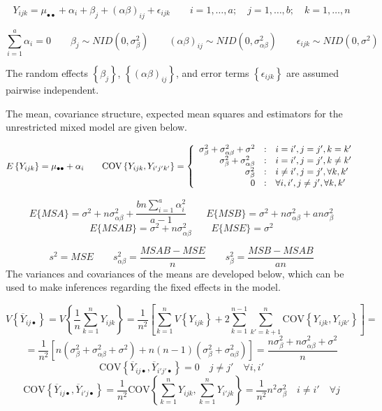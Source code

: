\documentclass[
]{book}
\begin{document}
\[
Y_{ijk}= \mu_{\bullet\bullet} + \alpha_i + \beta_j + (\alpha\beta)_{ij} + \epsilon_{ijk}
\qquad i=1,\ldots,a;\quad j=1,\ldots,b; \quad k=1,\ldots,n 
\]

\[
\sum_{i=1}^a \alpha_i = 0 \qquad \beta_j\sim NID\left(0,\sigma_{\beta}^2\right) \qquad
(\alpha\beta)_{ij} \sim NID\left(0,\sigma_{\alpha\beta}^2\right) \qquad
\epsilon_{ijk} \sim NID\left(0,\sigma^2\right)
\]

The random effects \(\left\{\beta_j\right\}\),
\(\left\{(\alpha\beta)_{ij}\right\}\), and error terms
\(\left\{\epsilon_{ijk}\right\}\) are assumed pairwise independent.

The mean, covariance structure, expected mean squares and estimators for
the unrestricted mixed model are given below.

\[
E\left\{Y_{ijk}\right\}=\mu_{\bullet\bullet}+ \alpha_i \qquad
\mbox{COV}\left\{Y_{ijk},Y_{i'j'k'}\right\} =
\left\{ \begin{array}{r@{\quad:\quad}l}
   \sigma_{\beta}^2 + \sigma_{\alpha\beta}^2 +  \sigma^2 & i=i',j=j',k=k' \\
   \sigma_{\beta}^2 + \sigma_{\alpha\beta}^2 & i=i', j=j',k\ne k' \\
     \sigma_{\beta}^2&  i\ne i', j= j',\forall k,k' \\
     0 & \forall i,i', j\ne j', \forall k,k' \\
    \end{array} \right.
\]

\[
E\{MSA\} = \sigma^2 +n\sigma_{\alpha\beta}^2+\frac{bn\sum_{i=1}^a\alpha_i^2}{a-1} \qquad
E\{MSB\} = \sigma^2 +n\sigma_{\alpha\beta}^2+ an\sigma_{\beta}^2
\] \[
E\{MSAB\}= \sigma^2 +n\sigma_{\alpha\beta}^2  \qquad E\{MSE\}=\sigma^2
\]

\[
s^2=MSE \qquad s_{\alpha\beta}^2=\frac{MSAB-MSE}{n} 
\qquad s_{\beta}^2=\frac{MSB-MSAB}{an}
\] The variances and covariances of the means are developed below, which
can be used to make inferences regarding the fixed effects in the model.

\[
V\left\{\overline{Y}_{ij\bullet}\right\} = 
V\left\{\frac{1}{n}\sum_{k=1}^nY_{ijk}\right\}=
\frac{1}{n^2}\left[\sum_{k=1}^n V\left\{Y_{ijk}\right\} +
2\sum_{k=1}^{n-1}\sum_{k'=k+1}^n\mbox{COV}\left\{Y_{ijk},Y_{ijk'}\right\}\right]
=
\] \[
= \frac{1}{n^2}\left[n\left(\sigma_{\beta}^2 + \sigma_{\alpha\beta}^2 +  \sigma^2\right)
+n(n-1)\left(\sigma_{\beta}^2 + \sigma_{\alpha\beta}^2\right)\right] = 
\frac{n\sigma_{\beta}^2 + n\sigma_{\alpha\beta}^2 + \sigma^2}{n}
\] \[
\mbox{COV}\left\{\overline{Y}_{ij\bullet},\overline{Y}_{i'j'\bullet}\right\}=0 \quad j\neq j' \quad \forall i,i'
\] \[
\mbox{COV}\left\{\overline{Y}_{ij\bullet},\overline{Y}_{i'j\bullet}\right\}=
\frac{1}{n^2} \mbox{COV}\left\{\sum_{k=1}^nY_{ijk},\sum_{k=1}^nY_{i'jk}\right\}=
\frac{1}{n^2}n^2\sigma_{\beta}^2
\quad i\neq i' \quad \forall j
\]
\end{document}
